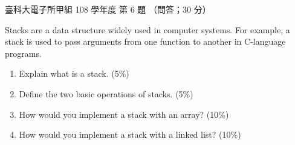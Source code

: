 \begin{pastexam}[label={px:ntust-108-et-dlds-06}]{臺科大電子所甲組 108 學年度 第 6 題}
（問答；30 分）

Stacks are a data structure widely used in computer systems. For example, a stack is used to pass
arguments from one function to another in C-language programs.
\begin{enumerate}[label=(\alph*)]
\item Explain what is a stack. (5\%)
\item Define the two basic operations of stacks. (5\%)
\item How would you implement a stack with an array? (10\%)
\item How would you implement a stack with a linked list? (10\%)
\end{enumerate}
\end{pastexam}

